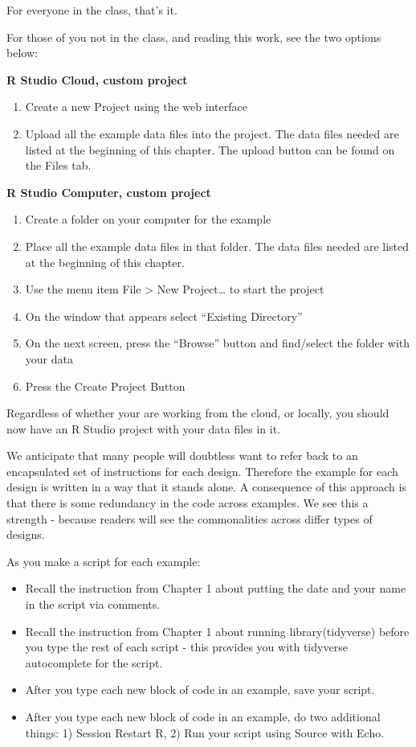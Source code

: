 \documentclass[
]{krantz}
\begin{document}
For everyone in the class, that's it.

For those of you not in the class, and reading this work, see the two options below:

\textbf{R Studio Cloud, custom project}

\begin{enumerate}
\def\labelenumi{\arabic{enumi}.}
\item
  Create a new Project using the web interface
\item
  Upload all the example data files into the project. The data files needed are listed at the beginning of this chapter. The upload button can be found on the Files tab.
\end{enumerate}

\textbf{R Studio Computer, custom project}

\begin{enumerate}
\def\labelenumi{\arabic{enumi}.}
\item
  Create a folder on your computer for the example
\item
  Place all the example data files in that folder. The data files needed are listed at the beginning of this chapter.
\item
  Use the menu item File \textgreater{} New Project\ldots{} to start the project
\item
  On the window that appears select ``Existing Directory''
\item
  On the next screen, press the ``Browse'' button and find/select the folder with your data
\item
  Press the Create Project Button
\end{enumerate}

Regardless of whether your are working from the cloud, or locally, you should now have an R Studio project with your data files in it.

We anticipate that many people will doubtless want to refer back to an encapsulated set of instructions for each design. Therefore the example for each design is written in a way that it stands alone. A consequence of this approach is that there is some redundancy in the code across examples. We see this a strength - because readers will see the commonalities across differ types of designs.

As you make a script for each example:

\begin{itemize}
\item
  Recall the instruction from Chapter 1 about putting the date and your name in the script via comments.
\item
  Recall the instruction from Chapter 1 about running library(tidyverse) before you type the rest of each script - this provides you with tidyverse autocomplete for the script.
\item
  After you type each new block of code in an example, save your script.
\item
  After you type each new block of code in an example, do two additional things: 1) Session Restart R, 2) Run your script using Source with Echo.
\end{itemize}
\end{document}
